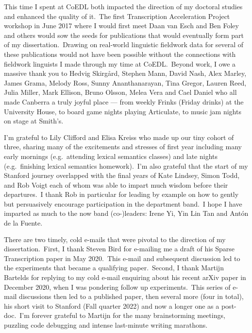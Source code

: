 \documentclass{report}
\begin{document}
This time I spent at CoEDL both impacted the direction of my doctoral studies and enhanced the quality of it.~The first Transcription Acceleration Project workshop in June 2017 where I would first meet Daan van Esch and Ben Foley and others would sow the seeds for publications that would eventually form part of my dissertation.~Drawing on real-world linguistic fieldwork data for several of these publications would not have been possible without the connections with fieldwork linguists I made through my time at CoEDL.~Beyond work, I owe a massive thank you to Hedvig Skirg\r{a}rd, Stephen Mann, David Nash, Alex Marley, James Grama, Melody Ross, Sunny Ananthanarayan, Tina Gregor, Lauren Reed, Julia Miller, Mark Ellison, Bruno Olsson, Melea Vera and Cael Daniel who all made Canberra a truly joyful place --- from weekly Frinks (Friday drinks) at the University House, to board game nights playing Articulate, to music jam nights on stage at Smith's.

I'm grateful to Lily Clifford and Elisa Kreiss who made up our tiny cohort of three, sharing many of the excitements and stresses of first year including many early mornings (e.g.~attending lexical semantics classes) and late nights (e.g.~finishing lexical semantics homework).~I'm also grateful that the start of my Stanford journey overlapped with the final years of Kate Lindsey, Simon Todd, and Rob Voigt each of whom was able to impart much wisdom before their departures.~I thank Rob in particular for leading by example on how to gently but persuasively encourage participation in the department band.~I hope I have imparted as much to the now band (co-)leaders: Irene Yi, Yin Lin Tan and Antón de la Fuente.

There are two timely, cold e-mails that were pivotal to the direction of my dissertation.~First, I thank Steven Bird for e-mailing me a draft of his Sparse Transcription paper in May 2020.~This e-mail and subsequent discussion led to the experiments that became a qualifying paper.~Second, I thank Martijn Bartelds for replying to my cold e-mail enquiring about his recent arXiv paper in December 2020, when I was pondering follow up experiments.~This series of e-mail discussions then led to a published paper, then several more (four in total), his short visit to Stanford (Fall quarter 2022) and now a longer one as a post-doc.~I'm forever grateful to Martijn for the many brainstorming meetings, puzzling code debugging and intense last-minute writing marathons.
\end{document}
